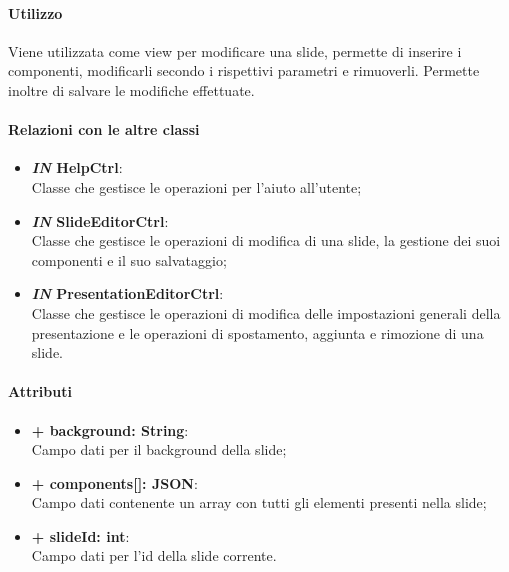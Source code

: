	\paragraph{Utilizzo}
	Viene utilizzata come view per modificare una slide, permette di inserire i componenti, modificarli secondo i rispettivi parametri e rimuoverli. Permette inoltre di salvare le modifiche effettuate.
	
	\paragraph{Relazioni con le altre classi}
	\begin{itemize}
		\item \textbf{\textit{IN} HelpCtrl}:\\
			Classe che gestisce le operazioni per l'aiuto all'utente;
		\item \textbf{\textit{IN} SlideEditorCtrl}:\\
			Classe che gestisce le operazioni di modifica di una slide, la gestione dei suoi componenti e il suo salvataggio;
		\item \textbf{\textit{IN} PresentationEditorCtrl}:\\
			Classe che gestisce le operazioni di modifica delle impostazioni generali della presentazione e le operazioni di spostamento, aggiunta e rimozione di una slide.
	\end{itemize}
	
	\paragraph{Attributi}
	\begin{itemize}
		\item \textbf{+ background: String}:\\
			Campo dati per il background della slide;
		\item \textbf{+ components[]: JSON}:\\
			Campo dati contenente un array con tutti gli elementi presenti nella slide;
		\item \textbf{+ slideId: int}:\\
			Campo dati per l'id della slide corrente.
	\end{itemize}